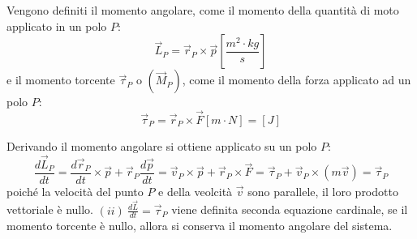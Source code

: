 \documentclass{article}
\numberwithin{equation}{subsection}
\begin{document}
Vengono definiti il momento angolare, come il momento della 
quantità di moto applicato in un polo $P$:
\begin{equation} 
    \vec{L}_P=\vec{r}_P\times\vec{p}\left[\displaystyle\frac{m^2\cdot kg}{s}\right]
\end{equation}
e il momento torcente $\vec{\tau}_P \mbox{ o }(\vec{M}_P)$, come il momento della forza applicato 
ad un polo $P$:
\begin{equation}
    \vec{\tau}_P=\vec{r}_P\times\vec{F}\left[m\cdot N\right]=[J]
\end{equation}

Derivando il momento angolare si ottiene applicato su un polo $P$: 
\begin{equation}
    \displaystyle\frac{d\vec{L}_P}{dt}=\frac{d\vec{r}_P}{dt}\times\vec{p}+\vec{r}_P\frac{d\vec{p}}{dt}=\vec{v}_P\times\vec{p}+\vec{r}_P\times\vec{F}=\vec{\tau}_P+\vec{v}_P\times(m\vec{v})=\vec{\tau}_P
\end{equation}
poiché la velocità del punto $P$ e della veolcità 
$\vec{v}$ sono parallele, il loro prodotto vettoriale è nullo.
$(ii)\:\displaystyle\frac{d\vec{L}}{dt}=\vec{\tau}_P$ viene 
definita seconda equazione cardinale, se il momento torcente 
è nullo, allora si conserva il momento angolare del sistema.\\
\end{document}
